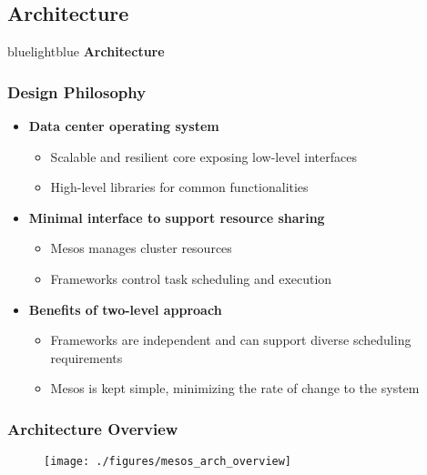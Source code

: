 \subsection{Architecture}
\begin{frame}
 \begin{colorblock}{blue}{lightblue}{ }
    \Large \textbf{Architecture}
  \end{colorblock}
\end{frame}

\begin{frame}
\frametitle{Design Philosophy}
\begin{itemize}
	\item {\bf Data center operating system}
	\begin{itemize}
		\item Scalable and resilient core exposing low-level interfaces 
		\item High-level libraries for common functionalities
	\end{itemize}

\vspace{20pt}

	\item {\bf Minimal interface to support resource sharing}
	\begin{itemize}
		\item Mesos manages cluster resources
		\item Frameworks control task scheduling and execution
	\end{itemize}

\vspace{20pt}

	\item {\bf Benefits of two-level approach}
	\begin{itemize}
		\item Frameworks are independent and can support diverse scheduling requirements
		\item Mesos is kept simple, minimizing the rate of change to the system
	\end{itemize}
\end{itemize}
\end{frame}

\begin{frame}
\frametitle{Architecture Overview}
\begin{figure}[h]
  \centering
  \texttt{[image: ./figures/mesos\_arch\_overview]}
  \label{fig:mesos_arch_overview}
\end{figure}
\end{frame}


